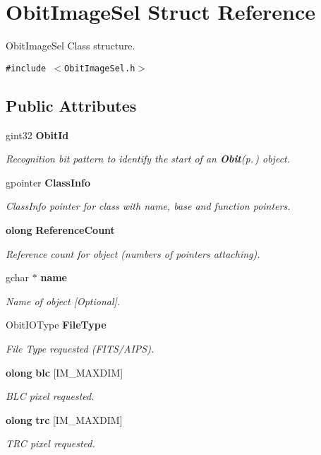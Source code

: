 \section{Obit\-Image\-Sel Struct Reference}
\label{structObitImageSel}
Obit\-Image\-Sel Class structure.  


{\tt \#include $<$Obit\-Image\-Sel.h$>$}

\subsection*{Public Attributes}
\begin{CompactItemize}
\item 
gint32 {\bf Obit\-Id}
\begin{CompactList}\small\item\em Recognition bit pattern to identify the start of an {\bf Obit}{\rm (p.\,\pageref{structObit})} object. \item\end{CompactList}\item 
gpointer {\bf Class\-Info}
\begin{CompactList}\small\item\em Class\-Info pointer for class with name, base and function pointers. \item\end{CompactList}\item 
{\bf olong} {\bf Reference\-Count}
\begin{CompactList}\small\item\em Reference count for object (numbers of pointers attaching). \item\end{CompactList}\item 
gchar $\ast$ {\bf name}
\begin{CompactList}\small\item\em Name of object [Optional]. \item\end{CompactList}\item 
Obit\-IOType {\bf File\-Type}
\begin{CompactList}\small\item\em File Type requested (FITS/AIPS). \item\end{CompactList}\item 
{\bf olong} {\bf blc} [IM\_\-MAXDIM]
\begin{CompactList}\small\item\em BLC pixel requested. \item\end{CompactList}\item 
{\bf olong} {\bf trc} [IM\_\-MAXDIM]
\begin{CompactList}\small\item\em TRC pixel requested. \item\end{CompactList}\end{CompactItemize}


